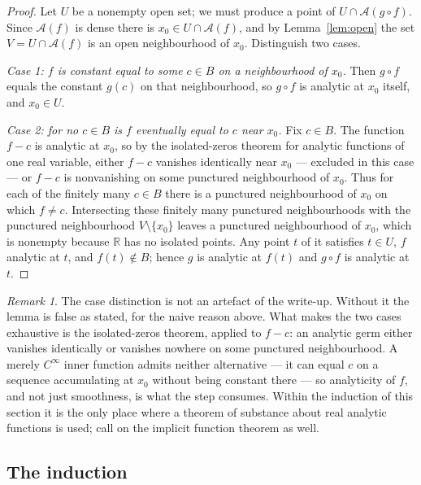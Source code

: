 \documentclass[11pt,oneside]{article}
\theoremstyle{definition}
\theoremstyle{remark}
\newtheorem{remark}[theorem]{Remark}
\newcommand{\R}{\mathbb R}
\newcommand{\An}{\mathcal A}
\begin{document}
\begin{proof}
Let $U$ be a nonempty open set; we must produce a point of $U\cap\An(g\circ
f)$.  Since $\An(f)$ is dense there is $x_0\in U\cap\An(f)$, and by
Lemma~\ref{lem:open} the set $V=U\cap\An(f)$ is an open neighbourhood of $x_0$.
Distinguish two cases.

\emph{Case 1: $f$ is constant equal to some $c\in B$ on a neighbourhood of
$x_0$.}  Then $g\circ f$ equals the constant $g(c)$ on that neighbourhood, so
$g\circ f$ is analytic at $x_0$ itself, and $x_0\in U$.

\emph{Case 2: for no $c\in B$ is $f$ eventually equal to $c$ near $x_0$.}  Fix
$c\in B$.  The function $f-c$ is analytic at $x_0$, so by the isolated-zeros
theorem for analytic functions of one real variable, either $f-c$ vanishes
identically near $x_0$ --- excluded in this case --- or $f-c$ is nonvanishing
on some punctured neighbourhood of $x_0$.  Thus for each of the finitely many
$c\in B$ there is a punctured neighbourhood of $x_0$ on which $f\ne c$.
Intersecting these finitely many punctured neighbourhoods with the punctured
neighbourhood $V\setminus\{x_0\}$ leaves a punctured neighbourhood of $x_0$,
which is nonempty because $\R$ has no isolated points.  Any point $t$ of it
satisfies $t\in U$, $f$ analytic at $t$, and $f(t)\notin B$; hence $g$ is
analytic at $f(t)$ and $g\circ f$ is analytic at $t$.
\end{proof}

\begin{remark}
The case distinction is not an artefact of the write-up.  Without it the lemma
is false as stated, for the naive reason above.  What makes the two cases
exhaustive is the isolated-zeros theorem, applied to $f-c$: an analytic germ
either vanishes identically or vanishes nowhere on some punctured
neighbourhood.  A merely $C^\infty$ inner function admits neither
alternative --- it can equal $c$ on a sequence accumulating at $x_0$ without
being constant there --- so analyticity of $f$, and not just smoothness, is
what the step consumes.  Within the induction of this section it is the only
place where a theorem of substance about real analytic functions is used;
 call on the implicit function theorem as
well.
\end{remark}

\subsection{The induction}
\end{document}
